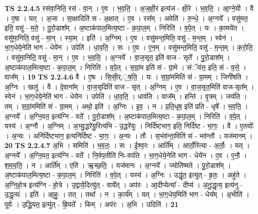 \documentclass[17pt]{extarticle}
\begin{document}
                  \newline
                                \textbf{ TS 2.2.4.5} \newline
                  रस॑वा॒निति॒ रस॑ - वा॒न् । ए॒व । भ॒व॒ति॒ । अ॒ज॒क्षी॒र इत्य॑ज - क्षी॒रे । भ॒व॒ति॒ । आ॒ग्ने॒यी । वै । ए॒षा । यत् । अ॒जा । सा॒क्षादिति॑ स - अ॒क्षात् । ए॒व । रस᳚म् । अवेति॑ । रु॒न्धे॒ । अ॒ग्नये᳚ । वसु॑मत॒ इति॒ वसु॑ - म॒ते॒ । पु॒रो॒डाश᳚म् । अ॒ष्टाक॑पाल॒मित्य॒ष्टा - क॒पा॒ल॒म् । निरिति॑ । व॒पे॒त् । यः । का॒मये॑त । वसु॑मा॒निति॒ वसु॑ - मा॒न् । स्या॒म् । इति॑ । अ॒ग्निम् । ए॒व । वसु॑मन्त॒मिति॒ वसु॑ - म॒न्त॒म् । स्वेन॑ । भा॒ग॒धेये॒नेति॑ भाग - धेये॑न । उपेति॑ । धा॒व॒ति॒ । सः । ए॒व । ए॒न॒म् । वसु॑मन्त॒मिति॒ वसु॑ - म॒न्त॒म् । क॒रो॒ति॒ । वसु॑मा॒निति॒॒ वसु॑ - मा॒न् । ए॒व । भ॒व॒ति॒ । अ॒ग्नये᳚ । वा॒ज॒सृत॒ इति॑ वाज - सृते᳚ । पु॒रो॒डाश᳚म् । अ॒ष्टाक॑पाल॒मित्य॒ष्टा - क॒पा॒ल॒म् । निरिति॑ । व॒पे॒त् । स॒ग्रां॒म इति॑ सं - ग्रा॒मे । संॅय॑त्त॒ इति॒ सं - य॒त्ते॒ । वाज᳚म् । \textbf{  19} \newline
                  \newline
                                \textbf{ TS 2.2.4.6} \newline
                  वै । ए॒षः । सि॒सी॒र्.॒ष॒ति॒ । यः । स॒ग्रां॒ममिति॑ सं - ग्रा॒मम् । जिगी॑षति । अ॒ग्निः । खलु॑ । वै । दे॒वाना᳚म् । वा॒ज॒सृदिति॑ वाज - सृत् । अ॒ग्निम् । ए॒व । वा॒ज॒सृत॒मिति॑ वाज-सृत᳚म् । स्वेन॑ । भा॒ग॒धेये॒नेति॑ भाग - धेये॑न । उपेति॑ । धा॒व॒ति॒ । धाव॑ति । वाज᳚म् । हन्ति॑ । वृ॒त्रम् । जय॑ति । तम् । स॒ग्रां॒ममिति॑ सं - ग्रा॒मम् । अथो॒ इति॑ । अ॒ग्निः । इ॒व॒ । न । प्र॒ति॒धृष॒ इति॑ प्रति - धृषे᳚ । भ॒व॒ति॒ । अ॒ग्नये᳚ । अ॒ग्नि॒वत॒ इत्य॑ग्नि - वते᳚ । पु॒रो॒डाश᳚म् । अ॒ष्टाक॑पाल॒मित्य॒ष्टा - क॒पा॒ल॒म् । निरिति॑ । व॒पे॒त् । यस्य॑ । अ॒ग्नौ । अ॒ग्निम् । अ॒भ्यु॒द्धरे॑यु॒रित्य॑भि - उ॒द्धरे॑युः । निर्दि॑ष्टभाग॒ इति॒ निर्दि॑ष्ट - भा॒गः॒ । वै । ए॒तयोः᳚ । अ॒न्यः । अनि॑र्दिष्टभाग॒ इत्यनि॑र्दिष्ट - भा॒गः॒ । अ॒न्यः । तौ । स॒भंव॑न्ता॒विति॑ सं - भव॑न्तौ । यज॑मानम् । \textbf{  20} \newline
                  \newline
                                \textbf{ TS 2.2.4.7} \newline
                  अ॒भि । समिति॑ । भ॒व॒तः॒ । सः । ई॒श्व॒रः । आर्ति᳚म् । आर्तो॒रित्या - अ॒र्तोः॒ । यत् । अ॒ग्नये᳚ । अ॒ग्नि॒वत॒ इत्य॑ग्नि - वते᳚ । नि॒र्वप॒तीति॑ निः-वप॑ति । भा॒ग॒धेये॒नेति॑ भाग - धेये॑न । ए॒व । ए॒नौ॒ । श॒म॒य॒ति॒ । न । आर्ति᳚म् । एति॑ । ऋ॒च्छ॒ति॒ । यज॑मानः । अ॒ग्नये᳚ । ज्योति॑ष्मते । पु॒रो॒डाश᳚म् । अ॒ष्टाक॑पाल॒मित्य॒ष्टा - क॒पा॒ल॒म् । निरिति॑ । व॒पे॒त् । यस्य॑ । अ॒ग्निः । उद्धृ॑त॒ इत्युत् - हृ॒तः॒ । अहु॑ते । अ॒ग्नि॒हो॒त्र इत्य॑ग्नि - हो॒त्रे । उ॒द्वाये॒दित्यु॑त् - वाये᳚त् । अप॑रः । आ॒दीप्येत्या᳚ - दीप्य॑ । अ॒नू॒द्धृत्य॒ इत्य॑नु - उ॒द्धृत्यः॑ । इति॑ । आ॒हुः॒ । तत् । तथा᳚ । न । का॒र्य᳚म् । यत् । भा॒ग॒धेय॒मिति॑ भाग - धेय᳚म् । अ॒भीति॑ । पूर्वः॑ । उ॒द्ध्रि॒यत॒ इत्यु॑त् - ह्रि॒यते᳚ । किम् । अप॑रः । अ॒भि । उदिति॑ । \textbf{  21} \newline
\end{document}
